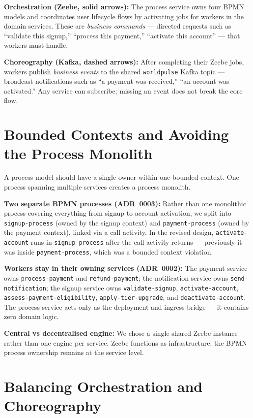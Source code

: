 \documentclass[10pt,a4paper]{article}
\begin{document}
\textbf{Orchestration (Zeebe, solid arrows):} The process service owns four BPMN models and coordinates user lifecycle flows by activating jobs for workers in the domain services. These are \emph{business commands} --- directed requests such as ``validate this signup,'' ``process this payment,'' ``activate this account'' --- that workers must handle.

\textbf{Choreography (Kafka, dashed arrows):} After completing their Zeebe jobs, workers publish \emph{business events} to the shared \texttt{worldpulse} Kafka topic --- broadcast notifications such as ``a payment was received,'' ``an account was activated.'' Any service can subscribe; missing an event does not break the core flow.


\section{Bounded Contexts and Avoiding the Process Monolith}

A process model should have a single owner within one bounded context. One process spanning multiple services creates a process monolith.

\textbf{Two separate BPMN processes (ADR~0003):} Rather than one monolithic process covering everything from signup to account activation, we split into \texttt{signup-process} (owned by the signup context) and \texttt{payment-process} (owned by the payment context), linked via a call activity. In the revised design, \texttt{activate-account} runs in \texttt{signup-process} after the call activity returns --- previously it was inside \texttt{payment-process}, which was a bounded context violation.

\textbf{Workers stay in their owning services (ADR~0002):} The payment service owns \texttt{process-payment} and \texttt{refund-payment}; the notification service owns \texttt{send-notification}; the signup service owns \texttt{validate-signup}, \texttt{activate-account}, \texttt{assess-payment-eligibility}, \texttt{apply-tier-upgrade}, and \texttt{deactivate-account}. The process service acts only as the deployment and ingress bridge --- it contains zero domain logic.

\textbf{Central vs decentralised engine:} We chose a single shared Zeebe instance rather than one engine per service. Zeebe functions as infrastructure; the BPMN process ownership remains at the service level.


\section{Balancing Orchestration and Choreography}
\end{document}

